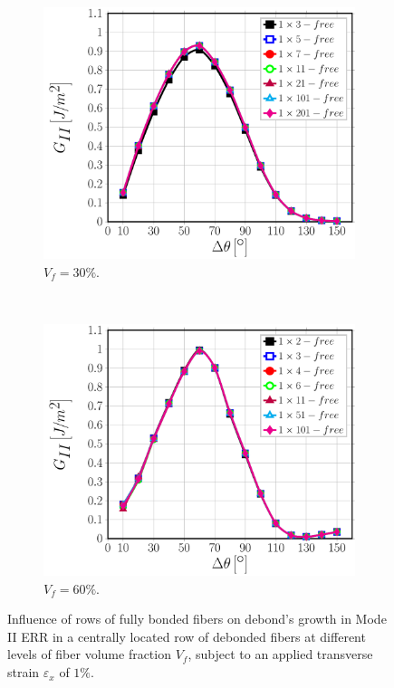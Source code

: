 \begin{figure}[!h]
\centering
    \begin{subfigure}[b]{0.45\textwidth}
        \includegraphics[width=\textwidth]{paperB/abovefibers-vf30-GII.pdf}
        \caption{$V_{f}=30\%$.}\label{paperB:subfig:abovefiber30MII}
    \end{subfigure} ~
    \begin{subfigure}[b]{0.45\textwidth}
        \includegraphics[width=\textwidth]{paperB/abovefibers-vf60-GII.pdf}
        \caption{$V_{f}=60\%$.}\label{paperB:subfig:abovefiber60MII}
    \end{subfigure}

\caption{Influence of rows of fully bonded fibers on debond's growth in Mode II ERR in a centrally located row of debonded fibers at different levels of fiber volume fraction $V_{f}$, subject to an applied transverse strain $\varepsilon_{x}$ of $1\%$.}\label{paperB:fig:abovefibersMII}
\end{figure}

